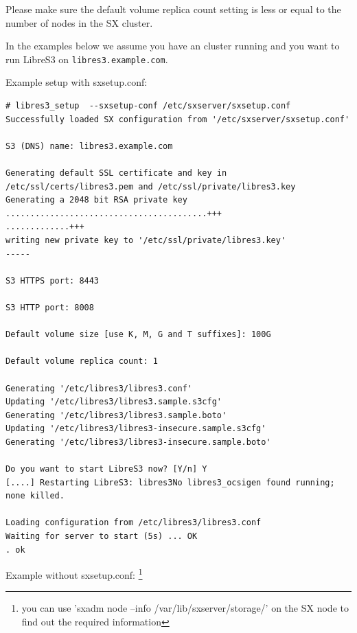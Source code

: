 Please make sure the default volume replica count setting is less or equal
to the number of nodes in the SX cluster.

In the examples below we assume you
have an \SX cluster running and you want to run
LibreS3 on \verb|libres3.example.com|.

Example setup with sxsetup.conf:

\begin{lstlisting}
# libres3_setup  --sxsetup-conf /etc/sxserver/sxsetup.conf
Successfully loaded SX configuration from '/etc/sxserver/sxsetup.conf'

S3 (DNS) name: libres3.example.com

Generating default SSL certificate and key in /etc/ssl/certs/libres3.pem and /etc/ssl/private/libres3.key
Generating a 2048 bit RSA private key
.........................................+++
.............+++
writing new private key to '/etc/ssl/private/libres3.key'
-----

S3 HTTPS port: 8443

S3 HTTP port: 8008

Default volume size [use K, M, G and T suffixes]: 100G

Default volume replica count: 1

Generating '/etc/libres3/libres3.conf'
Updating '/etc/libres3/libres3.sample.s3cfg'
Generating '/etc/libres3/libres3.sample.boto'
Updating '/etc/libres3/libres3-insecure.sample.s3cfg'
Generating '/etc/libres3/libres3-insecure.sample.boto'

Do you want to start LibreS3 now? [Y/n] Y
[....] Restarting LibreS3: libres3No libres3_ocsigen found running; none killed.

Loading configuration from /etc/libres3/libres3.conf
Waiting for server to start (5s) ... OK
. ok
\end{lstlisting}


Example without sxsetup.conf:
\footnote{you can use 'sxadm node --info /var/lib/sxserver/storage/' on the SX node to find out the required information}

